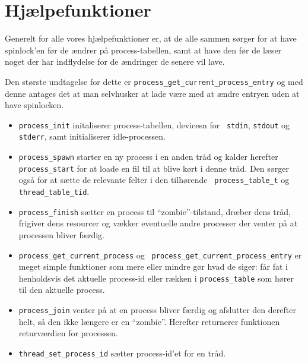 \section{Hjælpefunktioner}
Generelt for alle vores hjælpefunktioner er, at de alle sammen sørger for at
have spinlock'en før de ændrer på process-tabellen, samt at have den før de
læser noget der har indflydelse for de ændringer de senere vil lave.

Den største undtagelse for dette er {\tt process\_get\_current\_process\_entry}
og med denne antages det at man selvhusker at lade være med at ændre
entryen uden at have spinlocken.

\begin{itemize}
\item {\tt process\_init} initaliserer process-tabellen, devicesn for {\tt
stdin}, {\tt stdout} og {\tt stderr}, samt initialiserer idle-processen.

\item {\tt process\_spawn} starter en ny process i en anden tråd og kalder
herefter {\tt process\_start} for at loade en fil til at blive kørt i denne
tråd. Den sørger også for at sætte de relevante felter i den tilhørende {\tt
process\_table\_t} og {\tt thread\_table\_tid}.

\item {\tt process\_finish} sætter en process til ``zombie''-tilstand, dræber
dens tråd, frigiver dens resourcer og vækker eventuelle andre processer der
venter på at processen bliver færdig.

\item {\tt process\_get\_current\_process} og {\tt
process\_get\_current\_process\_entry} er meget simple funktioner som mere eller
mindre gør hvad de siger: får fat i henholdsvis det aktuelle process-id eller
rækken i {\tt process\_table} som hører til den aktuelle process.

\item {\tt process\_join} venter på at en process bliver færdig og afslutter den
derefter helt, så den ikke længere er en ``zombie''. Herefter returnerer
funktionen returværdien for processen.

\item {\tt thread\_set\_process\_id} sætter process-id'et for en tråd.
\end{itemize}
